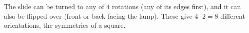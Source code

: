 The slide can be turned to any of $4$ rotations (any of its edges first), and it can also be flipped over (front or back facing the lamp). These give $4\cdot2=\boxed{8}$ different orientations, the symmetries of a square.
